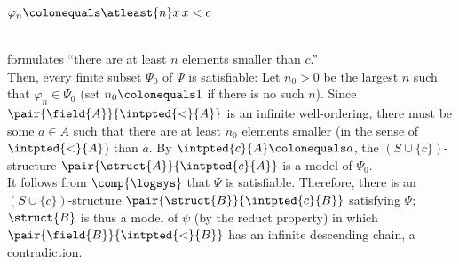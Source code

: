 \begin{enumerate}[1.]
\centerline{$\varphi_n \colonequals \atleast{n} x \, x < c$}\smallskip\\
formulates ``there are at least $n$ elements smaller than $c$.''\bigskip\\
Then, every finite subset $\Psi_0$ of $\Psi$ is satisfiable: Let $n_0 > 0$ be the largest $n$ such that $\varphi_n \in \Psi_0$ (set $n_0 \colonequals 1$ if there is no such $n$). Since $\pair{\field{A}}{{\intpted{<}{A}}}$ is an infinite well-ordering, there must be some $a \in A$ such that there are at least $n_0$ elements smaller (in the sense of $\intpted{<}{A}$) than $a$. By $\intpted{c}{A} \colonequals a$, the $(S \cup \{ c \})$-structure $\pair{\struct{A}}{\intpted{c}{A}}$ is a model of $\Psi_0$.\bigskip\\
It follows from $\comp{\logsys}$ that $\Psi$ is satisfiable. Therefore, there is an $(S \cup \{ c \})$-structure $\pair{\struct{B}}{\intpted{c}{B}}$ satisfying $\Psi$; $\struct{B}$ is thus a model of $\psi$ (by the reduct property) in which $\pair{\field{B}}{{\intpted{<}{B}}}$ has an infinite descending chain, a contradiction.
%
\end{enumerate}
